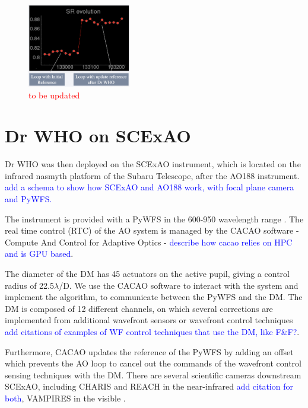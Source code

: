 \documentclass[twocolumn]{aastex62}
\begin{document}
\begin{figure}[ht!]
\begin{center}
\includegraphics[width=0.4\textwidth]{fig/compass_results1.png}
\caption{\textcolor{red}{to be updated} }
\label{fig:comapss_results1}
\end{center}
\end{figure}






\section{Dr WHO on SCExAO}

Dr WHO was then deployed on the SCExAO instrument, which is located on the infrared nasmyth platform of the Subaru Telescope, after the AO188 instrument. 
\textcolor{blue}{add a schema to show how SCExAO and AO188 work, with focal plane camera and PyWFS.\\}

The instrument is provided with a PyWFS in the 600-950 wavelength range \citep{Lozi2019PyWFS}. The real time control (RTC) of the AO system is managed by the CACAO software - Compute And Control for Adaptive Optics - \citep{cacao2018} \textcolor{blue}{describe how cacao relies on HPC and is GPU based}.

The diameter of the DM has 45 actuators on the active pupil, giving a control radius of 22.5$\lambda$/D. We use the CACAO software to interact with the system and implement the algorithm, to communicate between the PyWFS and the DM. The DM is composed of 12 different channels, on which several corrections are implemented from additional wavefront sensors or wavefront control techniques \textcolor{blue}{add citations of examples of WF control techniques that use the DM, like F&F?}.

Furthermore, CACAO updates the reference of the PyWFS by adding an offset which prevents the AO loop to cancel out the commands of the wavefront control sensing techniques with the DM. 
There are several scientific cameras downstream SCExAO, including CHARIS and REACH in the near-infrared \textcolor{blue}{add citation for both}, VAMPIRES in the visible \citep{vampires2015}. 
\end{document}
